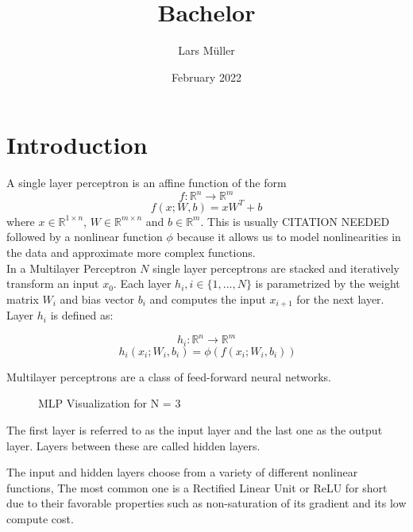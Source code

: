 \documentclass{article}
\title{Bachelor}
\author{Lars Müller}
\date{February 2022}
\begin{document}
\maketitle

\section{Introduction}

A single layer perceptron is an affine function of the form 
\begin{equation}
    f: 	\mathbb{R}^n \xrightarrow{} \mathbb{R}^m
\end{equation}
\begin{equation*}
    f(x; W, b) = x W^T + b
\end{equation*}
where $x\in \mathbb{R}^{1 \times n} $, $W\in \mathbb{R}^{m \times n}$ and $ b \in \mathbb{R}^m$.
This is usually CITATION NEEDED followed by a nonlinear function $\phi$ because it allows us
to model nonlinearities in the data and approximate more complex functions.\\

In a Multilayer Perceptron $N$ single layer perceptrons are stacked and iteratively transform an input $x_0$.
Each layer $h_i, i \in \{1, ..., N\}$ is parametrized by the weight matrix $W_i$ and bias vector $b_i$ and computes
the input $x_{i+1}$ for the next layer. Layer $h_i$ is defined as:

\begin{equation}
    h_i: \mathbb{R}^n \xrightarrow{} \mathbb{R}^m
\end{equation}
\begin{equation*}\
    h_i(x_i; W_i, b_i) = \phi(f(x_i; W_i, b_i))
\end{equation*}
 
\noindent Multilayer perceptrons are a class of feed-forward neural networks.
\begin{figure}[htbp]
  \centering
  
  \caption{MLP Visualization for N = 3}
\end{figure}

\noindent The first layer is referred to as the input layer and the last one as the output layer. Layers between
these are called hidden layers.

\noindent The input and hidden layers choose from a variety of different nonlinear functions,
The most common one is a Rectified Linear Unit or ReLU for short due to their
favorable properties such as non-saturation of its gradient and its low compute cost.
\end{document}
